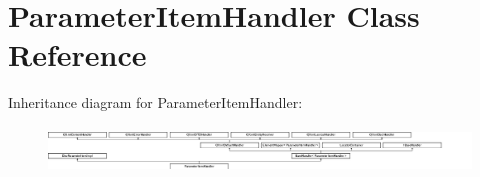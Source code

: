 \hypertarget{class_parameter_item_handler}{}\section{Parameter\+Item\+Handler Class Reference}
\label{class_parameter_item_handler}
Inheritance diagram for Parameter\+Item\+Handler\+:\begin{figure}[H]
\begin{center}
\leavevmode
\includegraphics[height=1.245136cm]{class_parameter_item_handler}
\end{center}
\end{figure}
